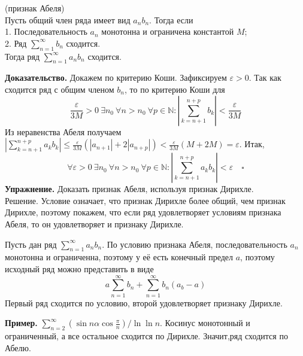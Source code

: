\begin{theor}
    (признак Абеля)\\
    Пусть общий член ряда имеет вид $a_nb_n$. Тогда если \\
    1. Последовательность  $a_n$ монотонна и ограничена константой $M$;\\
    2. Ряд  $\sum\limits_{n=1}^{\infty}b_n$ сходится.\\
Тогда ряд $\sum\limits_{n=1}^{\infty} a_nb_n$ сходится.
\end{theor}
\textbf{Доказательство.}  Докажем по критерию Коши. Зафиксируем 
$\varepsilon>0$. Так как сходится ряд с общим членом $b_n$, 
то по критерию Коши для 
$$\frac{\varepsilon}{3M}>0~\exists n_0~\forall n>n_0~\forall p\in\mathbb{N}:
\left| \sum\limits_{k=n+1}^{n+p} b_k \right| <\frac{\varepsilon}{3M}$$
Из неравенства Абеля получаем
$\left|\sum\limits_{k=n+1}^{n+p}a_k b_k\right| \leqslant
\frac{\varepsilon}{3M}(|a_{n+1}|+2|a_{n+p}|)<\frac{\varepsilon}{3M}(M+2M)
=\varepsilon$. Итак, 
$$\forall \varepsilon>0~\exists n_0~\forall n>n_0~\forall p\in\mathbb{N}:
\left| \sum\limits_{k=n+1}^{n+p} a_kb_k \right|<\varepsilon\quad\square$$
\textbf{Упражнение.} Доказать признак Абеля, используя признак Дирихле.\\
Решение. Условие означает, что признак Дирихле более общий, чем признак
Дирихле, поэтому покажем, что если ряд удовлетворяет условиям признака 
Абеля, то он удовлетворяет и признаку Дирихле. 

Пусть дан ряд $\sum\limits_{n=1}^{\infty} a_nb_n$. По 
условию признака Абеля, последовательность $a_n$ монотонна и ограниченна,
поэтому у её есть конечный предел $a$, %
поэтому исходный ряд можно представить в виде
$$a\sum\limits_{n=1}^{\infty} b_n+\sum\limits_{n=1}^{\infty} b_n(a_b-a)$$ 
Первый ряд сходится по условию, второй удовлетворяет признаку Дирихле. 

\textbf{Пример.} $\sum\limits_{n=2}^{\infty} (\sin{n\alpha}
\cos{\frac{\pi}{n}})/\ln{\ln{n}}$. Косинус монотонный и ограниченный, 
а все остальное сходится по Дирихле. Значит,ряд сходится по Абелю.

